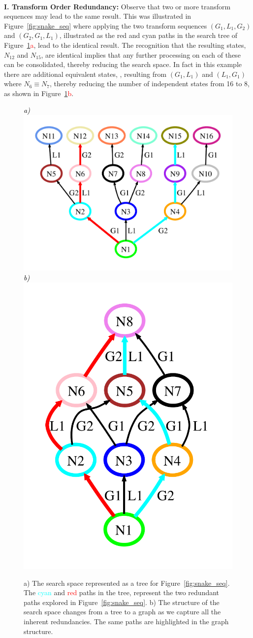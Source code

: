 

\noindent\\
{\bf I. Transform Order Redundancy: } Observe that two or more transform sequences may lead to the same result. This was illustrated in Figure~\ref{fig:snake_seq} where applying the two transform sequences $(G_1,L_1,G_2)$ and $(G_2,G_1,L_1)$, illustrated as the red and cyan paths in the search tree of Figure~\ref{fig:seq_cgraphs}\textcolor{red}{a}, lead to the identical result. The recognition that the resulting states, $N_{12}$ and $N_{15}$, are identical implies that any further processing on each of these can be consolidated, thereby reducing the search space. In fact in this example there are additional equivalent states, \eg, resulting from $(G_1,L_1)$ and $(L_1,G_1)$ where $N_6 \equiv N_7$, thereby reducing the number of independent states from 16 to 8, as shown in Figure~\ref{fig:seq_cgraphs}\textcolor{red}{b}.     



\begin{figure}[ht]
  \centering
  {\footnotesize\textit{\textcolor{black}{a)}}}\includegraphics[height=0.22\textwidth]{figs/full_snake_cgraph_no_red.pdf} 
  {\footnotesize\textit{\textcolor{black}{b)}}}\includegraphics[height=0.22\textwidth]{figs/full_snake_cgraph.pdf} 
  \caption{a) The search space represented as a tree for Figure~\ref{fig:snake_seq}. The \textcolor{cyan}{cyan} and \textcolor{red}{red} paths in the tree, represent the two redundant paths explored in Figure~\ref{fig:snake_seq}. b) The structure of the search space changes from a tree to a graph as we capture all the inherent redundancies. The same paths are highlighted in the graph structure. }
  \label{fig:seq_cgraphs}
\end{figure}

